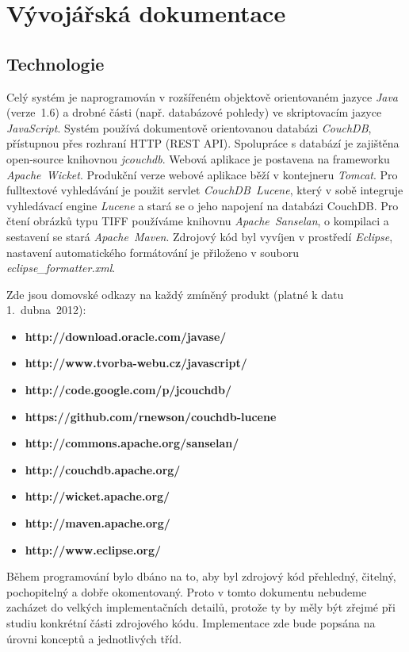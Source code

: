 \chapter{Vývojářská dokumentace}

\section{Technologie}

Celý systém je naprogramován v rozšířeném objektově orientovaném jazyce {\em Java} (verze~1.6) a drobné části (např. databázové pohledy) ve skriptovacím jazyce {\em JavaScript}. Systém používá dokumentově orientovanou databázi {\em CouchDB}, přístupnou přes rozhraní HTTP (REST API). Spolupráce s databází je zajištěna open-source knihovnou {\em jcouchdb}. Webová aplikace je postavena na frameworku {\em Apache~Wicket}. Produkční verze webové aplikace běží v kontejneru {\em Tomcat}. Pro fulltextové vyhledávání je použit servlet {\em CouchDB~Lucene}, který v sobě integruje vyhledávací engine {\em Lucene} a stará se o jeho napojení na databázi CouchDB. Pro čtení obrázků typu TIFF používáme knihovnu {\em Apache~Sanselan}, o kompilaci a sestavení se stará {\em Apache~Maven}. Zdrojový kód byl vyvíjen v prostředí {\em Eclipse}, nastavení automatického formátování je přiloženo v souboru {\em eclipse\_formatter.xml}.

Zde jsou domovské odkazy na každý zmíněný produkt (platné k datu 1.~dubna~2012):

\begin{itemize}
\item{\bf http://download.oracle.com/javase/}
\item{\bf http://www.tvorba-webu.cz/javascript/}
\item{\bf http://code.google.com/p/jcouchdb/}
\item{\bf https://github.com/rnewson/couchdb-lucene}
\item{\bf http://commons.apache.org/sanselan/}
\item{\bf http://couchdb.apache.org/}
\item{\bf http://wicket.apache.org/}
\item{\bf http://maven.apache.org/}
\item{\bf http://www.eclipse.org/}
\end{itemize}

Během programování bylo dbáno na to, aby byl zdrojový kód přehledný, čitelný, pochopitelný a dobře okomentovaný. Proto v tomto dokumentu nebudeme zacházet do velkých implementačních detailů, protože ty by měly být zřejmé při studiu konkrétní části zdrojového kódu. Implementace zde bude popsána na úrovni konceptů a jednotlivých tříd.

